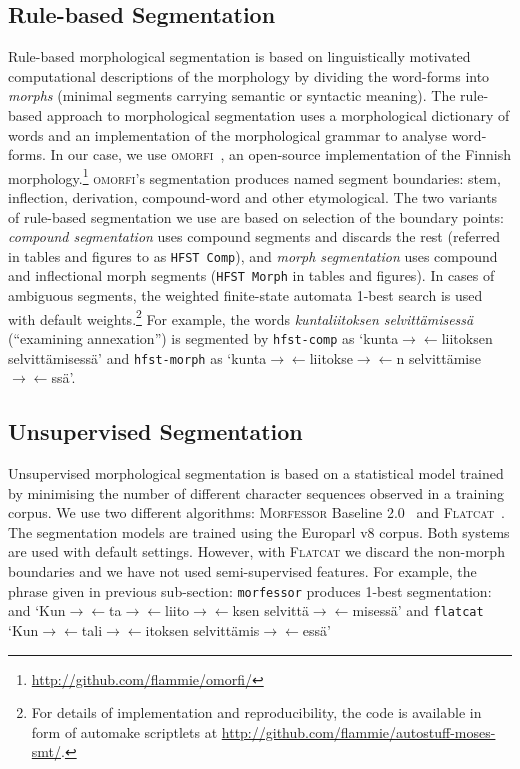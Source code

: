 \documentclass[postprint]{flammie}
\begin{document}
\subsection{Rule-based Segmentation}
\label{subsection:rule_based}
%
Rule-based morphological segmentation is based on linguistically motivated computational descriptions of the morphology by dividing the word-forms into \textit{morphs} (minimal segments carrying semantic or syntactic meaning). The rule-based approach to morphological segmentation uses a morphological dictionary of words and an implementation of the morphological grammar to analyse word-forms. In our case, we use \textsc{omorfi}~\cite{pirinen2015omorfi}, an %
open-source implementation of the Finnish morphology.\footnote{\url{http://github.com/flammie/omorfi/}} \textsc{omorfi}'s segmentation produces named segment boundaries: stem, inflection, derivation, compound-word and other etymological. The two variants of rule-based segmentation we use are based on selection of the boundary points: \textit{compound segmentation} uses compound segments and discards the rest (referred in tables and figures to as \texttt{HFST Comp}), and \textit{morph segmentation} uses compound and inflectional morph segments (\texttt{HFST Morph} in tables and figures). In cases of ambiguous segments, the weighted finite-state automata 1-best search is used with default weights.\footnote{For details of implementation and reproducibility, the code is available in form of automake scriptlets at \url{http://github.com/flammie/autostuff-moses-smt/}.} %
%
For example, the words \textit{kuntaliitoksen selvitt\"amisess\"a} (``examining annexation'') is segmented by \texttt{hfst-comp} as `kunta$\rightarrow \leftarrow$liitoksen selvitt\"amisess\"a' and \texttt{hfst-morph} as `kunta$\rightarrow \leftarrow$liitokse$\rightarrow \leftarrow$n selvitt\"amise$\rightarrow \leftarrow$ss\"a'.

\subsection{Unsupervised Segmentation}
\label{subsection:unsupervised}
%
Unsupervised morphological segmentation is based on a statistical model trained by minimising the number of different character sequences observed in a training corpus. We use two different algorithms: \textsc{Morfessor} Baseline 2.0~\cite{morfessor} and \textsc{Flatcat}~\cite{flatcat}.
The segmentation models are trained using the Europarl v8 corpus. Both systems are used with default settings. However, with \textsc{Flatcat} we discard the non-morph boundaries and we have not used semi-supervised features.
For example, the phrase given in previous sub-section:  \texttt{morfessor} produces 1-best segmentation: and `Kun$\rightarrow \leftarrow$ta$\rightarrow \leftarrow$liito$\rightarrow \leftarrow$ksen selvitt\"a$\rightarrow \leftarrow$misess\"a' and \texttt{flatcat} `Kun$\rightarrow \leftarrow$tali$\rightarrow \leftarrow$itoksen selvitt\"amis$\rightarrow \leftarrow$ess\"a'
\end{document}

